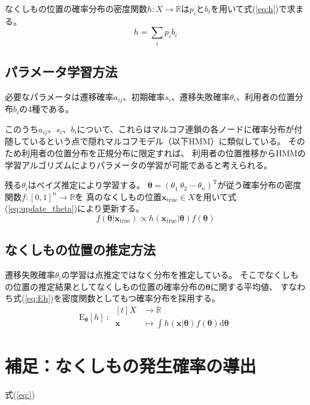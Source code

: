 \documentclass{jarticle}
\numberwithin{equation}{section}
\numberwithin{table}{section}
\begin{document}
なくしもの位置の確率分布の密度関数$h:X \rightarrow \mathbb{R}$は$p_i$と$b_i$を用いて式(\ref{eq:h})で求まる。
\begin{equation}
    \label{eq:h}
    h = \sum_{i} {p_i b_i}
\end{equation}


\subsection{パラメータ学習方法}
必要なパラメータは遷移確率$a_{i j}$、初期確率$s_i$、遷移失敗確率$\theta_i$、利用者の位置分布$b_i$の4種である。

このうち$a_{i j}$、$s_i$、$b_i$について、これらはマルコフ連鎖の各ノードに確率分布が付随しているという点で隠れマルコフモデル（以下HMM）に類似している。
そのため利用者の位置分布を正規分布に限定すれば、
利用者の位置推移からHMMの学習アルゴリズムによりパラメータの学習が可能であると考えられる。

残る$\theta_i$はベイズ推定により学習する。
$\bm{\theta} = (\theta_1\ \theta_2\ \cdots\ \theta_n)^\mathrm{T}$が従う確率分布の密度関数$f:[0,1]^n \rightarrow \mathbb{R}$を
真のなくしもの位置$\bm{x}_\mathrm{true} \in X$を用いて式(\ref{eq:update_theta})により更新する。
\begin{equation}
    \label{eq:update_theta}
    f(\bm{\theta} | \bm{x}_\mathrm{true}) \propto h(\bm{x}_\mathrm{true} | \bm{\theta}) f(\bm{\theta})
\end{equation}


\subsection{なくしもの位置の推定方法}
遷移失敗確率$\theta_i$の学習は点推定ではなく分布を推定している。
そこでなくしもの位置の推定結果としてなくしもの位置の確率分布の$\bm{\theta}$に関する平均値、
すなわち式(\ref{eq:Eh})を密度関数としてもつ確率分布を採用する。
\begin{equation}
    \label{eq:Eh}
    \mathrm{E}_\bm{\theta} [h]\ :\ 
    \begin{aligned}[t]
        X &\rightarrow \mathbb{R} \\
        \bm{x} &\mapsto \int {h(\bm{x} | \bm{\theta}) f(\bm{\theta}) \mathrm{d} \bm{\theta}}
    \end{aligned}
\end{equation}


\section{補足：なくしもの発生確率の導出}
\label{sec:calc_p}
式(\ref{eq:})
\end{document}
